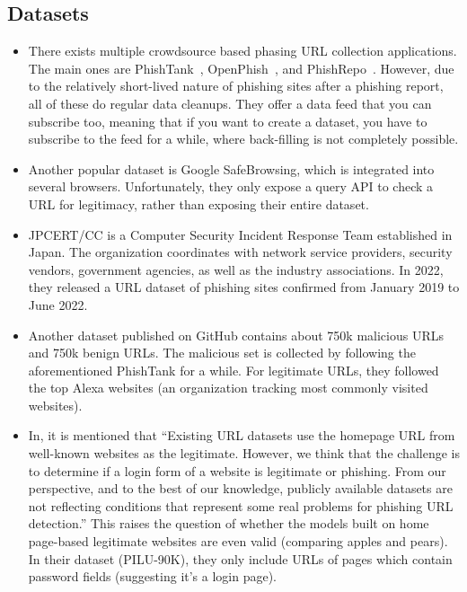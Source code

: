 \documentclass{article}
\begin{document}
    \subsection{Datasets}\label{subsec:datasets}

    \begin{itemize}
        \item There exists multiple crowdsource based phasing URL collection applications. The main ones are PhishTank~\cite{PhishTank}, OpenPhish~\cite{OpenPhish}, and PhishRepo~\cite{PhishRepo}. However, due to the relatively short-lived nature of phishing sites after a phishing report, all of these do regular data cleanups. They offer a data feed that you can subscribe too, meaning that if you want to create a dataset, you have to subscribe to the feed for a while, where back-filling is not completely possible.
        \item Another popular dataset is Google SafeBrowsing\cite{GoogleSafeBrowsing}, which is integrated into several browsers. Unfortunately, they only expose a query API to check a URL for legitimacy, rather than exposing their entire dataset.
        \item JPCERT/CC is a Computer Security Incident Response Team established in Japan. The organization coordinates with network service providers, security vendors, government agencies, as well as the industry associations\cite{JPCertCC}. In 2022, they released a URL dataset of phishing sites confirmed from January 2019 to June 2022\cite{JPCertCCDataset}.
        \item Another dataset published on GitHub contains about 750k malicious URLs and 750k benign URLs\cite{VisualizingRNNInURLDetection}. The malicious set is collected by following the aforementioned PhishTank for a while. For legitimate URLs, they followed the top Alexa websites (an organization tracking most commonly visited websites).
        \item In\cite{PhishingLoginURLDetection}, it is mentioned that ``Existing URL datasets use the homepage URL from well-known websites as the legitimate. However, we think that the challenge is to determine if a login form of a website is legitimate or phishing. From our perspective, and to the best of our knowledge, publicly available datasets are not reflecting conditions that represent some real problems for phishing URL detection.'' This raises the question of whether the models built on home page-based legitimate websites are even valid (comparing apples and pears). In their dataset (PILU-90K), they only include URLs of pages which contain password fields (suggesting it's a login page).

\end{itemize}
\end{document}
